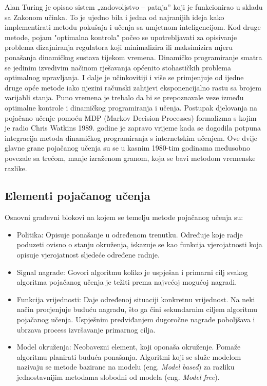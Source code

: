 Alan Turing je opisao sistem „zadovoljstvo – patnja” koji je funkcionirao u skladu sa Zakonom učinka. To je ujedno bila i jedna od najranijih ideja kako implementirati metodu pokušaja i učenja sa umjetnom inteligencijom. Kod druge metode, pojam "optimalna kontrola" počeo se upotrebljavati za opisivanje problema dizajniranja regulatora koji minimalizira ili maksimizira mjeru ponašanja dinamičkog sustava tijekom vremena. Dinamičko programiranje smatra se jedinim izvedivim načinom rješavanja općenito stohastičkih problema optimalnog upravljanja. I dalje je učinkovitiji i više se primjenjuje od ijedne druge opće metode iako njezini računski zahtjevi eksponencijalno rastu sa brojem varijabli stanja. Puno vremena je trebalo da bi se prepoznavale veze između optimalne kontrole i dinamičkog programiranja i učenja. Postupak djelovanja na pojačano učenje pomoću MDP (Markov Decision Processes) formalizma s kojim je radio Chris Watkins 1989. godine je zapravo vrijeme kada se dogodila potpuna integracija metoda dinamičkog programiranja s internetskim učenjem.
Ove dvije glavne grane pojačanog učenja su se u kasnim 1980-tim godinama međusobno povezale sa trećom, manje izraženom granom, koja se bavi metodom vremenske razlike.

\subsection{Elementi pojačanog učenja}
Osnovni građevni blokovi na kojem se temelju metode pojačanog učenja su:
\begin{itemize}
	\item Politika: Opisuje ponašanje u određenom trenutku. Određuje koje radje poduzeti ovisno o stanju okruženja, iskazuje se kao funkcija vjerojatnosti koja opisuje vjerojatnost sljedeće određene radnje.
	
	\item Signal nagrade: Govori algoritmu koliko je uspješan i primarni cilj svakog algoritma pojačanog učenja je težiti prema najvećoj mogućoj nagradi. 
	
	\item Funkcija vrijednosti: Daje određenoj situaciji konkretnu vrijednost. Na neki način procjenjuje buduću nagradu, što ga čini sekundarnim ciljem algoritmu pojačanog učenja. Uspješnim predviđanjem dugoročne nagrade poboljšava i ubrzava process izvršavanje primarnog cilja. 
	
	\item Model okruženja: Neobavezni element, koji oponaša okruženje. Pomaže algoritmu planirati buduća ponašanja. Algoritmi koji se služe modelom nazivaju se metode bazirane na modelu (eng. \textit{Model based}) za razliku jednostavnijim metodama slobodni od modela (eng. \textit{Model free}).
\end{itemize}

